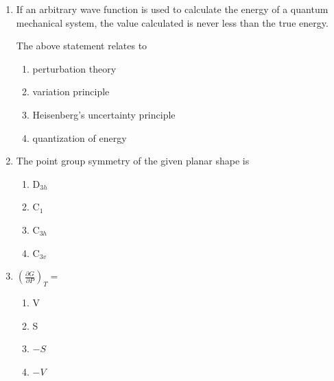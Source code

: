 \documentclass[journal,12pt,onecolumn]{IEEEtran}
\theoremstyle{remark}
\begin{document}
\begin{enumerate}
\item    \hspace{0.5 cm} If an arbitrary wave function is used to calculate the energy of a quantum mechanical system, the value calculated is never less than the true energy.

The above statement relates to  \hfill{}

\begin{multicols}{2}
\begin{enumerate}
    \item perturbation theory
    \item variation principle
    \item Heisenberg's uncertainty principle
    \item quantization of energy
\end{enumerate}
\end{multicols}
 

\item    \hspace{0.5 cm} The point group symmetry of the given planar shape is  \hfill{}

\begin{center}
\end{center}

\begin{multicols}{2}
\begin{enumerate}
    \item D$_{3h}$
    \item C$_1$
    \item C$_{3h}$
    \item C$_{3v}$
\end{enumerate}
\end{multicols}
 

\item    \hspace{0.5cm} \( \left( \frac{\partial G}{\partial P} \right)_T = \)  \hfill{}

\begin{multicols}{2}
\begin{enumerate}
    \item V
    \item S
    \item $-S$
    \item $-V$
\end{enumerate}
\end{multicols}
 



\end{enumerate}
\end{document}
